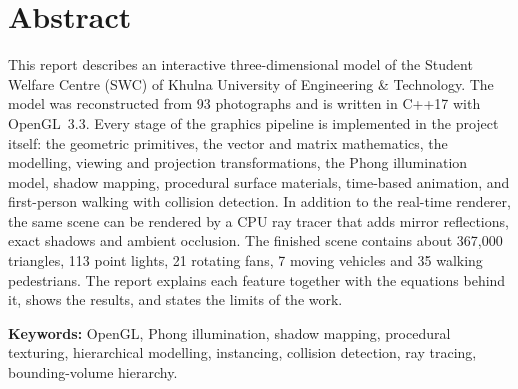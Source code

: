 \documentclass[11pt,a4paper]{article}
\begin{document}
\section*{Abstract}
This report describes an interactive three-dimensional model of the Student
Welfare Centre (SWC) of Khulna University of Engineering \& Technology. The
model was reconstructed from 93 photographs and is written in C++17 with
OpenGL~3.3. Every stage of the graphics pipeline is implemented in the
project itself: the geometric primitives, the vector and matrix mathematics,
the modelling, viewing and projection transformations, the Phong
illumination model, shadow mapping, procedural surface materials,
time-based animation, and first-person walking with collision detection. In
addition to the real-time renderer, the same scene can be rendered by a CPU
ray tracer that adds mirror reflections, exact shadows and ambient
occlusion. The finished scene contains about 367{,}000 triangles, 113 point
lights, 21 rotating fans, 7 moving vehicles and 35 walking pedestrians. The
report explains each feature together with the equations behind it, shows
the results, and states the limits of the work.


\textbf{Keywords:} OpenGL, Phong illumination, shadow mapping, procedural
texturing, hierarchical modelling, instancing, collision detection, ray
tracing, bounding-volume hierarchy.
\end{document}
